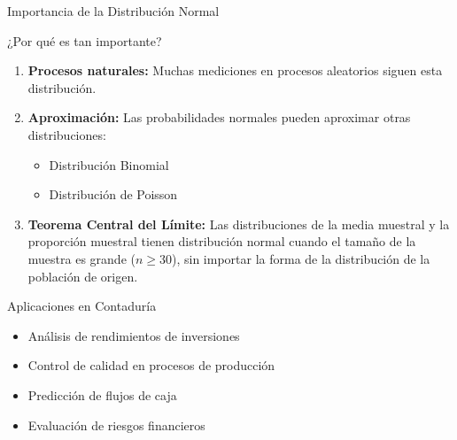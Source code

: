 \documentclass[10pt]{beamer}
\begin{document}
\begin{frame}{Importancia de la Distribución Normal}
\begin{block}{¿Por qué es tan importante?}
\begin{enumerate}
  \item \textbf{Procesos naturales:} Muchas mediciones en procesos aleatorios siguen esta distribución.

  \item \textbf{Aproximación:} Las probabilidades normales pueden aproximar otras distribuciones:
  \begin{itemize}
    \item Distribución Binomial
    \item Distribución de Poisson
  \end{itemize}

  \item \textbf{Teorema Central del Límite:} Las distribuciones de la media muestral y la proporción muestral tienen distribución normal cuando el tamaño de la muestra es grande ($n \geq 30$), sin importar la forma de la distribución de la población de origen.
\end{enumerate}
\end{block}

\vspace{0.3cm}
\begin{exampleblock}{Aplicaciones en Contaduría}
\begin{itemize}
  \item Análisis de rendimientos de inversiones
  \item Control de calidad en procesos de producción
  \item Predicción de flujos de caja
  \item Evaluación de riesgos financieros
\end{itemize}
\end{exampleblock}
\end{frame}
\end{document}
